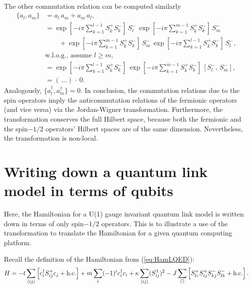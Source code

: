 \documentclass[a4paper]{report}
\begin{document}
\begin{spacing}{1.1}
\begin{appendices}
\begin{align*}
\end{align*}
The other commutation relation can be computed similarly
\begin{align*}
    \{a_l,a_m\} &= a_l\,a_m + a_m\, a_l,\\
        &= \exp[-i\pi \sum_{k=1}^{l-1} S_k^+S_k^-] \, S_l^-\,\exp[-i\pi \sum_{k=1}^{m-1} S_k^+S_k^-] \, S_m^- \\
        &\qquad + \exp[-i\pi \sum_{k=1}^{m-1} S_k^+ S_k^-] \, S_m^-\,\exp[-i\pi \sum_{k=1}^{l-1} S_k^+S_k^-] \, S_l^-, \\
        &\text{w.l.o.g., assume $l\geq m$,} \\
        &= \exp[-i\pi \sum_{k=1}^{l-1} S_k^+S_k^-] \, \exp[-i\pi \sum_{k=1}^{m-1} S_k^+S_k^-] \,\left[ S_l^-,\, S_m^- \right],\\
        &= \left( \,\dots \right)\,\cdot \, 0.
\end{align*}
Analogously, $\{a^\dagger_l,a^\dagger_m\} = 0$. In conclusion, the commutation relations due to the spin operators imply the anticommutation relations of the fermionic operators (and vice versa) via the Jordan-Wigner transformation. Furthermore, the transformation conserves the full Hilbert space, because both the fermionic and the spin$-1/2$ operators' Hilbert spaces are of the same dimension. Nevertheless, the transformation is non-local.

\newpage
\section{Writing down a quantum link model in terms of qubits}
Here, the Hamiltonian for a U(1) gauge invariant quantum link model is written down in terms of only spin$-1/2$ operators. This is to illustrate a use of the transformation to translate the Hamiltonian for a given quantum computing platform.

Recall the definition of the Hamiltonian from (\ref{eq:HamLQED}):
\begin{align}
    H = -t \sum_{\expval{ij}} \left[ c^\dagger_i S^+_{ij} c_j + \textnormal{h.c.} \right] + m \sum_i (-1)^i c^\dagger_i c_i + \kappa \sum_{\expval{ij}} (S^3_{ij})^2 -J \sum_\square \left[ S^+_{li} S^+_{ij} S^-_{kj} S^-_{lk} + \textnormal{h.c.}\right].
\end{align}


\end{appendices}
\end{spacing}
\end{document}
